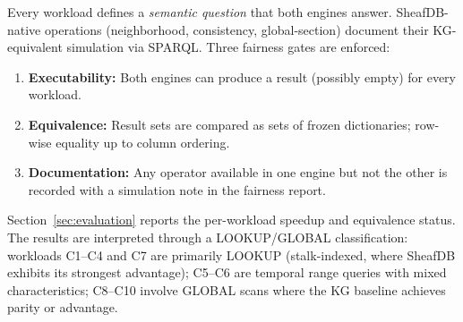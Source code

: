 Every workload defines a \emph{semantic question} that both engines answer.
SheafDB-native operations (neighborhood, consistency, global-section)
document their KG-equivalent simulation via SPARQL.  Three fairness gates
are enforced:

\begin{enumerate}
    \item \textbf{Executability:} Both engines can produce a result (possibly
    empty) for every workload.
    \item \textbf{Equivalence:} Result sets are compared as sets of frozen
    dictionaries; row-wise equality up to column ordering.
    \item \textbf{Documentation:} Any operator available in one engine but
    not the other is recorded with a simulation note in the fairness report.
\end{enumerate}

Section~\ref{sec:evaluation} reports the per-workload speedup and equivalence
status.  The results are interpreted through a LOOKUP/GLOBAL classification:
workloads C1--C4 and C7 are primarily LOOKUP (stalk-indexed, where SheafDB
exhibits its strongest advantage); C5--C6 are temporal range queries with
mixed characteristics; C8--C10 involve GLOBAL scans where the KG baseline
achieves parity or advantage.
